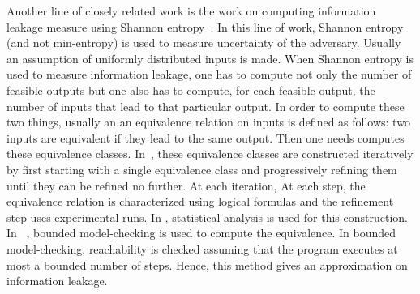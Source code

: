 Another line of closely related work is the work on computing information leakage measure using Shannon entropy~\cite{BackesKopf,Malacria07}. In this line of work, 
Shannon entropy (and not min-entropy) is used to measure uncertainty of the adversary. Usually an assumption of uniformly distributed inputs is made. When Shannon entropy is used to measure information leakage, one has to compute not only the number of feasible outputs but one also has to compute, for each feasible output,  the number of inputs that lead to that particular output. In order to compute these two things, usually an an equivalence relation on inputs is defined as follows: two inputs are equivalent if they lead to the same output. Then one needs computes these equivalence classes. In~\cite{BackesKopf}, these equivalence classes are constructed iteratively by first starting with a single equivalence class and progressively refining them until they can be refined no further. At each iteration,  At each step, the equivalence relation is characterized using logical formulas and the refinement step uses experimental runs. In \cite{Kopf}, statistical analysis is used for this construction. In ~\cite{Malacria07}, bounded model-checking is used to compute the equivalence. In bounded model-checking, reachability is checked assuming that the program executes at most a bounded number of steps. Hence, this method gives an approximation on information leakage. 

%
%
%
%
